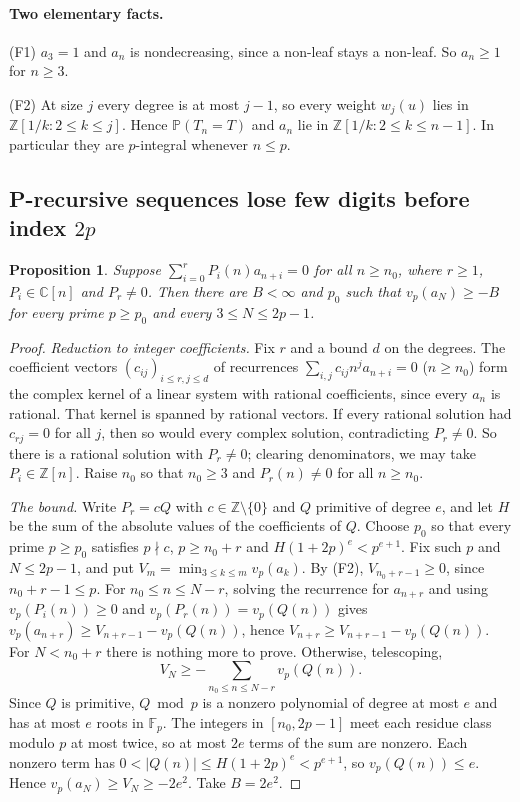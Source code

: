 \documentclass[11pt]{article}
\newtheorem{proposition}[lemma]{Proposition}
\theoremstyle{remark}
\newcommand{\Prob}{\mathbb P}
\begin{document}
\paragraph{Two elementary facts.}
(F1) $a_3=1$ and $a_n$ is nondecreasing, since a non-leaf stays a non-leaf. So $a_n\ge1$ for $n\ge3$.

(F2) At size $j$ every degree is at most $j-1$, so every weight $w_j(u)$ lies in $\mathbb Z[1/k:2\le k\le j]$. Hence $\Prob(T_n=T)$ and $a_n$ lie in $\mathbb Z[1/k:2\le k\le n-1]$. In particular they are $p$-integral whenever $n\le p$.

\subsection{P-recursive sequences lose few digits before index $2p$}
\begin{proposition}\label{prop:window-bound}
Suppose $\sum_{i=0}^rP_i(n)a_{n+i}=0$ for all $n\ge n_0$, where $r\ge1$, $P_i\in\mathbb C[n]$ and $P_r\ne0$. Then there are $B<\infty$ and $p_0$ such that $v_p(a_N)\ge-B$ for every prime $p\ge p_0$ and every $3\le N\le2p-1$.
\end{proposition}
\begin{proof}
\emph{Reduction to integer coefficients.} Fix $r$ and a bound $d$ on the degrees. The coefficient vectors $(c_{ij})_{i\le r,j\le d}$ of recurrences $\sum_{i,j}c_{ij}n^ja_{n+i}=0$ ($n\ge n_0$) form the complex kernel of a linear system with rational coefficients, since every $a_n$ is rational. That kernel is spanned by rational vectors. If every rational solution had $c_{rj}=0$ for all $j$, then so would every complex solution, contradicting $P_r\ne0$. So there is a rational solution with $P_r\ne0$; clearing denominators, we may take $P_i\in\mathbb Z[n]$. Raise $n_0$ so that $n_0\ge3$ and $P_r(n)\ne0$ for all $n\ge n_0$.

\emph{The bound.} Write $P_r=cQ$ with $c\in\mathbb Z\setminus\{0\}$ and $Q$ primitive of degree $e$, and let $H$ be the sum of the absolute values of the coefficients of $Q$. Choose $p_0$ so that every prime $p\ge p_0$ satisfies $p\nmid c$, $p\ge n_0+r$ and $H(1+2p)^e<p^{e+1}$. Fix such $p$ and $N\le2p-1$, and put $V_m=\min_{3\le k\le m}v_p(a_k)$. By (F2), $V_{n_0+r-1}\ge0$, since $n_0+r-1\le p$. For $n_0\le n\le N-r$, solving the recurrence for $a_{n+r}$ and using $v_p(P_i(n))\ge0$ and $v_p(P_r(n))=v_p(Q(n))$ gives $v_p(a_{n+r})\ge V_{n+r-1}-v_p(Q(n))$, hence $V_{n+r}\ge V_{n+r-1}-v_p(Q(n))$. For $N<n_0+r$ there is nothing more to prove. Otherwise, telescoping,
\[
 V_N\ge-\sum_{n_0\le n\le N-r}v_p(Q(n)).
\]
Since $Q$ is primitive, $Q\bmod p$ is a nonzero polynomial of degree at most $e$ and has at most $e$ roots in $\mathbb F_p$. The integers in $[n_0,2p-1]$ meet each residue class modulo $p$ at most twice, so at most $2e$ terms of the sum are nonzero. Each nonzero term has $0<|Q(n)|\le H(1+2p)^e<p^{e+1}$, so $v_p(Q(n))\le e$. Hence $v_p(a_N)\ge V_N\ge-2e^2$. Take $B=2e^2$.
\end{proof}
\end{document}
